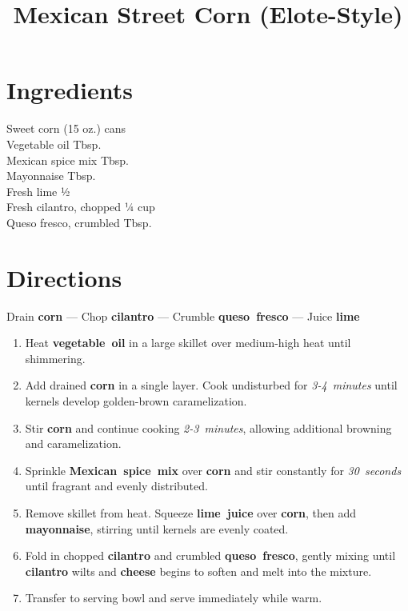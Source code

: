 \documentclass[11pt,letterpaper]{article}
\title{Mexican Street Corn (Elote-Style)}
\author{}
\date{}
\begin{document}
\maketitle
\thispagestyle{empty}

\section*{Ingredients}
\setlength{\columnsep}{20pt}
\begin{multicols}{2}
\noindent
    Sweet corn  (15 oz.) cans \\
    Vegetable oil  Tbsp. \\
    Mexican spice mix  Tbsp. \\
    Mayonnaise  Tbsp. \\
    \columnbreak
    Fresh lime \dotfill ½ \\
    Fresh cilantro, chopped \dotfill ¼ cup \\
    Queso fresco, crumbled  Tbsp. \\
\end{multicols}

\section*{Directions}

\noindent
Drain \textbf{corn} ---
Chop \textbf{cilantro} ---
Crumble \textbf{queso~fresco} ---
Juice \textbf{lime}

\begin{enumerate}
    \item Heat \textbf{vegetable~oil} in a large skillet over medium-high heat until shimmering.
    
    \item Add drained \textbf{corn} in a single layer. Cook undisturbed for \textit{3-4~minutes} until kernels develop golden-brown caramelization.
    
    \item Stir \textbf{corn} and continue cooking \textit{2-3~minutes}, allowing additional browning and caramelization.
    
    \item Sprinkle \textbf{Mexican~spice~mix} over \textbf{corn} and stir constantly for \textit{30~seconds} until fragrant and evenly distributed.
    
    \item Remove skillet from heat. Squeeze \textbf{lime~juice} over \textbf{corn}, then add \textbf{mayonnaise}, stirring until kernels are evenly coated.
    
    \item Fold in chopped \textbf{cilantro} and crumbled \textbf{queso~fresco}, gently mixing until \textbf{cilantro} wilts and \textbf{cheese} begins to soften and melt into the mixture.
    
    \item Transfer to serving bowl and serve immediately while warm.
\end{enumerate}
\end{document}
